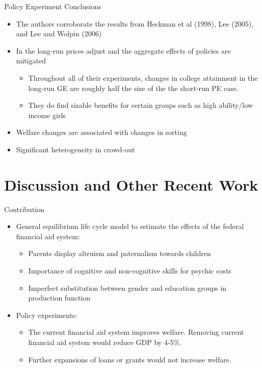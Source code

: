 \documentclass{beamer}
\begin{document}
\begin{frame}{Policy Experiment Conclusions}

\begin{itemize}
\item The authors corroborate the results from Heckman et al (1998), Lee (2005), and Lee and Wolpin (2006) 
\item In the long-run prices adjust and the aggregate effects of policies are mitigated
\begin{itemize}
\item Throughout all of their experiments, changes in college attainment in the long-run GE are roughly half the size of the the short-run PE case.
\item They do find sizable benefits for certain groups such as high ability/low income girls
\end{itemize}
\item Welfare changes are associated with changes in sorting
\item Significant heterogeneity in crowd-out
\end{itemize}
\end{frame}

\section{Discussion and Other Recent Work}
\begin{frame}{Contribution}
\begin{itemize}
\item General equilibrium life cycle model to estimate the effects of the federal financial aid system: 
\begin{itemize}
\item Parents display altruism and paternalism towards children
\item Importance of cognitive and non-cognitive skills for psychic costs 
\item Imperfect substitution between gender and education groups in production function
\end{itemize}
\item Policy experiments:
\begin{itemize} 
\item The current financial aid system improves welfare. Removing current financial aid system would reduce GDP by 4-5\%.
\item Further expansions of loans or grants would not increase welfare.
\end{itemize}
\end{itemize}
\end{frame}
\end{document}
